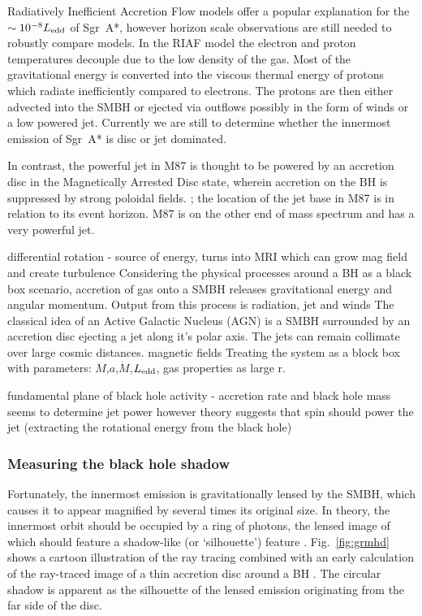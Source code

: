 {Radiatively Inefficient Accretion Flow \citep[(RIAF),][]{Narayan_1995,Yuan_2003} models offer a popular explanation for the $\sim 10^{-8} L_{\rm edd}$ of Sgr~A*, however horizon scale observations are still needed to robustly compare models. In the RIAF model the electron and proton temperatures decouple due to the low density of the gas. Most of the gravitational energy is converted into the viscous thermal energy of protons which radiate inefficiently compared to electrons. The protons are then either advected into the SMBH or ejected via outflows possibly in the form of winds or a low powered jet. Currently we are still to determine whether the innermost emission of Sgr~A* is disc or jet dominated.


In contrast, the powerful jet in M87 is thought to be powered by an accretion disc in the Magnetically Arrested Disc \citep[(MAD),][]{Narayan_2003} state, wherein accretion on the BH is suppressed by strong poloidal fields. ; the location of the jet base in M87 is in relation to its event horizon. M87 is on the other end of mass spectrum and has a very powerful jet.


differential rotation - source of energy, turns into MRI which can grow mag field and create turbulence
 Considering the physical processes around a BH as a black box scenario, accretion of gas onto a SMBH releases gravitational energy and angular momentum. Output from this process is radiation, jet and winds  The classical idea of an Active Galactic Nucleus (AGN) is a SMBH surrounded by an accretion disc ejecting a jet along it's polar axis. The jets can remain collimate over large cosmic distances. magnetic fields
 Treating the system as a block box with parameters: $M$,$a$,$\dot{M}$,$L_{\rm edd}$, gas properties as large r. 


fundamental plane of black hole activity - accretion rate and black hole mass seems to determine jet power however theory suggests that spin should power the jet (extracting the rotational energy from the black hole)



\subsubsection{Measuring the black hole shadow}

Fortunately, the innermost emission is gravitationally lensed by the SMBH, which causes it to appear magnified by several times its original size. In theory, the innermost orbit should be occupied by a ring of photons, the lensed image of which should feature a shadow-like (or `silhouette') feature \citep[e.g.][]{Johannsen_2010}. Fig.~\ref{fig:grmhd} shows a cartoon illustration of the ray tracing combined with an early calculation of the ray-traced image of a thin accretion disc around a BH \citep{Luminet_1979}. The circular shadow is apparent as the silhouette of the lensed emission originating from the far side of the disc. 



}
